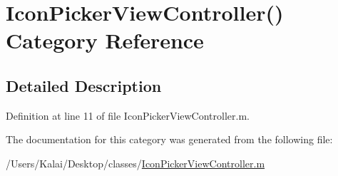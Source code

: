\hypertarget{category_icon_picker_view_controller_07_08}{\section{Icon\-Picker\-View\-Controller() Category Reference}
\label{category_icon_picker_view_controller_07_08}
}


\subsection{Detailed Description}


Definition at line 11 of file Icon\-Picker\-View\-Controller.\-m.



The documentation for this category was generated from the following file\-:\begin{DoxyCompactItemize}
\item 
/\-Users/\-Kalai/\-Desktop/classes/\hyperlink{_icon_picker_view_controller_8m}{Icon\-Picker\-View\-Controller.\-m}\end{DoxyCompactItemize}
